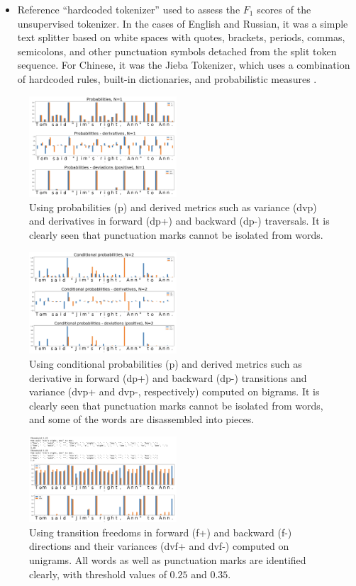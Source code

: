 \documentclass[11pt]{article}
\begin{document}
\begin{itemize}
\item Reference “hardcoded tokenizer” used to assess the $F_1$ scores of the unsupervised tokenizer. In the cases of English and Russian, it was a simple text splitter based on white spaces with quotes, brackets, periods, commas, semicolons, and other punctuation symbols detached from the split token sequence. For Chinese, it was the Jieba Tokenizer, which uses a combination of hardcoded rules, built-in dictionaries, and probabilistic measures \citep{18}. 
\end{itemize}

\begin{figure}
  \includegraphics[width=0.49\textwidth]{emnlp2022/imgs/figure1.png}
  \caption{Using probabilities (p) and derived metrics such as variance (dvp) and derivatives in forward (dp+) and backward (dp-) traversals. It is clearly seen that punctuation marks cannot be isolated from words.}
\end{figure}

\begin{figure}[!ht]
  \includegraphics[width=0.49\textwidth]{emnlp2022/imgs/figure2.png}
  \caption{Using conditional probabilities (p) and derived metrics such as derivative in forward (dp+) and backward (dp-) transitions and variance (dvp+ and dvp-, respectively) computed on bigrams. It is clearly seen that punctuation marks cannot be isolated from words, and some of the words are disassembled into pieces.}
\end{figure}

\begin{figure}[!ht]
  \includegraphics[width=0.49\textwidth]{emnlp2022/imgs/figure3.png}
  \caption{Using transition freedoms in forward (f+) and backward (f-) directions and their variances (dvf+ and dvf-) computed on unigrams. All words as well as punctuation marks are identified clearly, with threshold values of $0.25$ and $0.35$.}
\end{figure}
\end{document}

